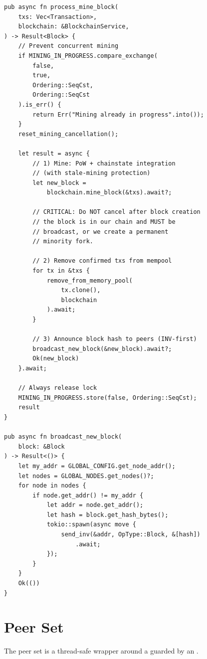 \begin{listing}[htbp]
\caption{Mining execution and broadcast}
\label{lst:ch13-mining-exec}
\begin{verbatim}
pub async fn process_mine_block(
    txs: Vec<Transaction>,
    blockchain: &BlockchainService,
) -> Result<Block> {
    // Prevent concurrent mining
    if MINING_IN_PROGRESS.compare_exchange(
        false,
        true,
        Ordering::SeqCst,
        Ordering::SeqCst
    ).is_err() {
        return Err("Mining already in progress".into());
    }
    reset_mining_cancellation();

    let result = async {
        // 1) Mine: PoW + chainstate integration
        // (with stale-mining protection)
        let new_block =
            blockchain.mine_block(&txs).await?;

        // CRITICAL: Do NOT cancel after block creation
        // the block is in our chain and MUST be
        // broadcast, or we create a permanent
        // minority fork.

        // 2) Remove confirmed txs from mempool
        for tx in &txs {
            remove_from_memory_pool(
                tx.clone(),
                blockchain
            ).await;
        }

        // 3) Announce block hash to peers (INV-first)
        broadcast_new_block(&new_block).await?;
        Ok(new_block)
    }.await;

    // Always release lock
    MINING_IN_PROGRESS.store(false, Ordering::SeqCst);
    result
}

pub async fn broadcast_new_block(
    block: &Block
) -> Result<()> {
    let my_addr = GLOBAL_CONFIG.get_node_addr();
    let nodes = GLOBAL_NODES.get_nodes()?;
    for node in nodes {
        if node.get_addr() != my_addr {
            let addr = node.get_addr();
            let hash = block.get_hash_bytes();
            tokio::spawn(async move {
                send_inv(&addr, OpType::Block, &[hash])
                    .await;
            });
        }
    }
    Ok(())
}
\end{verbatim}
\end{listing}

\section{Peer Set}
\label{sec:ch13-peer-set}

The peer set is a thread-safe wrapper around a  guarded by an .

